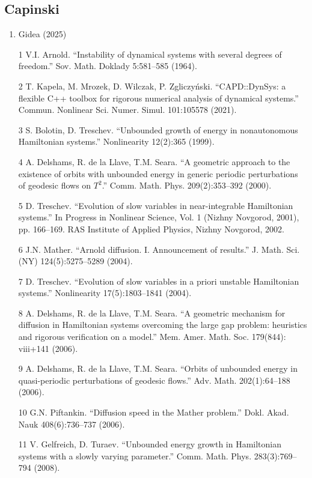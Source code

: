 \documentclass[12pt]{article}
\begin{document}
\subsection*{Capinski}
\begin{enumerate}
\item Gidea (2025)
\item [1] V.I. Arnold. ``Instability of dynamical systems with several degrees of freedom.'' Sov. Math. Doklady 5:581--585 (1964).
\item [2] T. Kapela, M. Mrozek, D. Wilczak, P. Zgliczyński. ``CAPD::DynSys: a flexible C++ toolbox for rigorous numerical analysis of dynamical systems.'' Commun. Nonlinear Sci. Numer. Simul. 101:105578 (2021).
\item [3] S. Bolotin, D. Treschev. ``Unbounded growth of energy in nonautonomous Hamiltonian systems.'' Nonlinearity 12(2):365 (1999).
\item [4] A. Delshams, R. de la Llave, T.M. Seara. ``A geometric approach to the existence of orbits with unbounded energy in generic periodic perturbations of geodesic flows on $T^2$.'' Comm. Math. Phys. 209(2):353--392 (2000).
\item [5] D. Treschev. ``Evolution of slow variables in near-integrable Hamiltonian systems.'' In Progress in Nonlinear Science, Vol. 1 (Nizhny Novgorod, 2001), pp. 166--169. RAS Institute of Applied Physics, Nizhny Novgorod, 2002.
\item [6] J.N. Mather. ``Arnold diffusion. I. Announcement of results.'' J. Math. Sci. (NY) 124(5):5275--5289 (2004).
\item [7] D. Treschev. ``Evolution of slow variables in a priori unstable Hamiltonian systems.'' Nonlinearity 17(5):1803--1841 (2004).
\item [8] A. Delshams, R. de la Llave, T.M. Seara. ``A geometric mechanism for diffusion in Hamiltonian systems overcoming the large gap problem: heuristics and rigorous verification on a model.'' Mem. Amer. Math. Soc. 179(844): viii+141 (2006).
\item [9] A. Delshams, R. de la Llave, T.M. Seara. ``Orbits of unbounded energy in quasi-periodic perturbations of geodesic flows.'' Adv. Math. 202(1):64--188 (2006).
\item [10] G.N. Piftankin. ``Diffusion speed in the Mather problem.'' Dokl. Akad. Nauk 408(6):736--737 (2006).
\item [11] V. Gelfreich, D. Turaev. ``Unbounded energy growth in Hamiltonian systems with a slowly varying parameter.'' Comm. Math. Phys. 283(3):769--794 (2008).

\end{enumerate}
\end{document}
